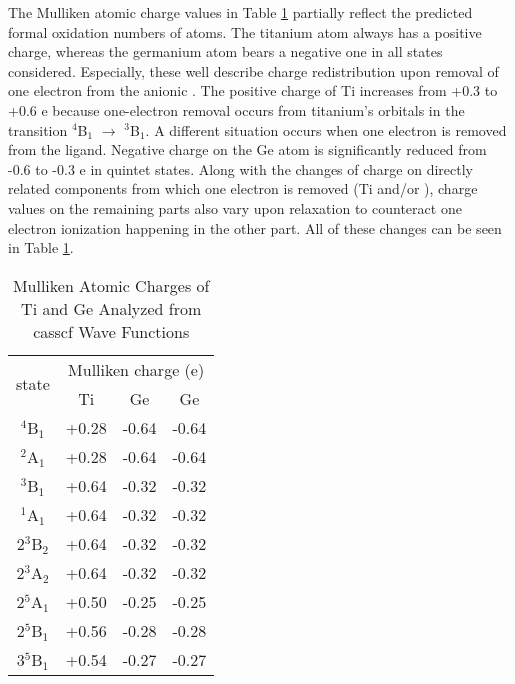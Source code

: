 \begin{refsection}
The Mulliken atomic charge values in Table \ref{tbl4:charge} partially reflect the predicted formal oxidation numbers of atoms. The titanium atom always has a positive charge, whereas the germanium atom bears a negative one in all states considered. Especially, these well describe charge redistribution upon removal of one electron from the anionic . The positive charge of Ti increases from +0.3 to +0.6 e because one-electron removal occurs from titanium’s orbitals in the transition $^4$B$_1$ $\longrightarrow$ $^3$B$_1$. A different situation occurs when one electron is removed from the  ligand. Negative charge on the Ge atom is significantly reduced from -0.6 to -0.3 e in quintet states. Along with the changes of charge on directly related components from which one electron is removed (Ti and/or ), charge values on the remaining parts also vary upon relaxation to counteract one electron ionization happening in the other part. All of these changes can be seen in Table \ref{tbl4:charge}.




\begin{table}[htbp!]
	\centering
	\caption{Mulliken Atomic Charges of Ti and Ge Analyzed from \acrshort{casscf} Wave Functions}
	\label{tbl4:charge}
	\begin{tabular}{@{}cccc@{}}
	\toprule
	\multirow{2}{*}{state}	  & \multicolumn{3}{c}{Mulliken charge (e)} \\ \cmidrule(l){2-4} 
	      		& Ti          & Ge          & Ge          \\
	$^4$B$_1$   & +0.28       & -0.64       & -0.64       \\
	$^2$A$_1$   & +0.28       & -0.64       & -0.64       \\
	$^3$B$_1$   & +0.64       & -0.32       & -0.32       \\
	$^1$A$_1$   & +0.64       & -0.32       & -0.32       \\
	2$^3$B$_2$  & +0.64       & -0.32       & -0.32       \\
	2$^3$A$_2$  & +0.64       & -0.32       & -0.32       \\
	2$^5$A$_1$  & +0.50       & -0.25       & -0.25       \\
	2$^5$B$_1$  & +0.56       & -0.28       & -0.28       \\
	3$^5$B$_1$  & +0.54       & -0.27       & -0.27       \\ \bottomrule
	\end{tabular}
	\end{table}





\end{refsection}
